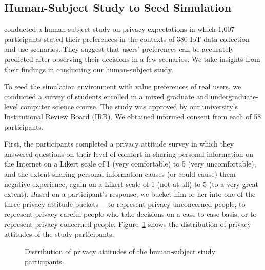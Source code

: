 \subsection{Human-Subject Study to Seed Simulation}
\label{sec:survey}

\citet{Naeini-SOUPS2017-PrivacyExpectations+IOT} conducted a human-subject study on privacy expectations in which 1,007 participants stated their preferences in the contexts of 380 IoT data collection and use scenarios. They suggest that users' preferences can be accurately predicted after observing their decisions in a few scenarios. We take insights from their findings in conducting our human-subject study. 

To seed the simulation environment with value preferences of real users, we conducted a survey of students enrolled in a mixed graduate and undergraduate-level computer science course. The study was approved by our university's Institutional Review Board (IRB). We obtained informed consent from each of 58 participants. 

First, the participants completed a privacy attitude survey \citep{schnorf2014comparison} in which they answered questions on their level of comfort in sharing personal information on the Internet on a Likert scale of 1 (very comfortable) to 5 (very uncomfortable), and the extent sharing personal information causes (or could cause) them negative experience, again on a Likert scale of 1 (not at all) to 5 (to a very great extent). 
Based on a participant's response, we bucket him or her into one of the three privacy attitude buckets--- to represent privacy unconcerned people,  to represent privacy careful people who take decisions on a case-to-case basis, or  to represent privacy concerned people. 
Figure~\ref{fig:participants-privacy-distribution} shows the distribution of privacy attitudes of the study participants. 

 \begin{figure}[!tb]
 \centering
  \caption{Distribution of privacy attitudes of the human-subject study participants.}
  \label{fig:participants-privacy-distribution}
 \end{figure}
 

